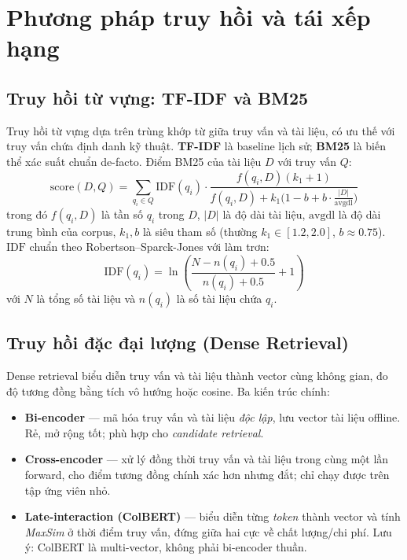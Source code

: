 \section{Phương pháp truy hồi và tái xếp hạng}
\label{sec:retrieval}

\subsection{Truy hồi từ vựng: TF-IDF và BM25}
\label{subsec:lexical}

Truy hồi từ vựng dựa trên trùng khớp từ giữa truy vấn và tài liệu, có ưu thế với truy vấn chứa định danh kỹ thuật. \textbf{TF-IDF} là baseline lịch sử; \textbf{BM25} \cite{robertson2009bm25} là biến thể xác suất chuẩn de-facto. Điểm BM25 của tài liệu $D$ với truy vấn $Q$:
\begin{equation}
\mathrm{score}(D, Q) = \sum_{q_i \in Q} \mathrm{IDF}(q_i) \cdot
\frac{f(q_i, D) (k_1 + 1)}{f(q_i, D) + k_1 \big(1 - b + b \cdot \frac{|D|}{\mathrm{avgdl}}\big)}
\end{equation}
trong đó $f(q_i, D)$ là tần số $q_i$ trong $D$, $|D|$ là độ dài tài liệu, $\mathrm{avgdl}$ là độ dài trung bình của corpus, $k_1, b$ là siêu tham số (thường $k_1 \in [1.2, 2.0]$, $b \approx 0.75$). $\mathrm{IDF}$ chuẩn theo Robertson--Sparck-Jones với làm trơn:
\begin{equation}
\mathrm{IDF}(q_i) = \ln\!\left( \frac{N - n(q_i) + 0.5}{n(q_i) + 0.5} + 1 \right)
\end{equation}
với $N$ là tổng số tài liệu và $n(q_i)$ là số tài liệu chứa $q_i$.

\subsection{Truy hồi đặc đại lượng (Dense Retrieval)}
\label{subsec:dense}

Dense retrieval biểu diễn truy vấn và tài liệu thành vector cùng không gian, đo độ tương đồng bằng tích vô hướng hoặc cosine. Ba kiến trúc chính:
\begin{itemize}
  \item \textbf{Bi-encoder} \cite{reimers2019sbert,karpukhin2020dpr} --- mã hóa truy vấn và tài liệu \textit{độc lập}, lưu vector tài liệu offline. Rẻ, mở rộng tốt; phù hợp cho \textit{candidate retrieval}.
  \item \textbf{Cross-encoder} \cite{nogueira2019passage} --- xử lý đồng thời truy vấn và tài liệu trong cùng một lần forward, cho điểm tương đồng chính xác hơn nhưng đắt; chỉ chạy được trên tập ứng viên nhỏ.
  \item \textbf{Late-interaction (ColBERT)} \cite{khattab2020colbert} --- biểu diễn từng \textit{token} thành vector và tính \textit{MaxSim} ở thời điểm truy vấn, đứng giữa hai cực về chất lượng/chi phí. Lưu ý: ColBERT là multi-vector, không phải bi-encoder thuần.
\end{itemize}

